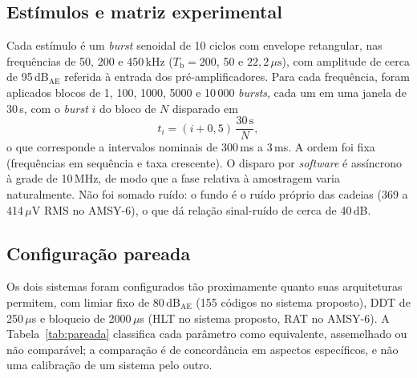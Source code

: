 \subsection{Estímulos e matriz experimental}
\label{subsec:sinais_teste}
\label{v2:subsec:sinais_teste}

Cada estímulo é um \textit{burst} senoidal de 10 ciclos com envelope retangular, nas frequências de 50, 200 e 450\,kHz (\(T_{\mathrm{b}} = 200\), 50 e \(22{,}2\,\mu\mathrm{s}\)), com amplitude de cerca de 95\,dB\(_{\mathrm{AE}}\) referida à entrada dos pré-amplificadores. Para cada frequência, foram aplicados blocos de 1, 100, 1000, 5000 e 10\,000 \textit{bursts}, cada um em uma janela de 30\,s, com o \textit{burst} \(i\) do bloco de \(N\) disparado em
\begin{equation}
	t_i = (i + 0{,}5)\,\frac{30\,\mathrm{s}}{N},
	\label{eq:instantes_disparo}
\end{equation}
o que corresponde a intervalos nominais de 300\,ms a 3\,ms. A ordem foi fixa (frequências em sequência e taxa crescente). O disparo por \textit{software} é assíncrono à grade de 10\,MHz, de modo que a fase relativa à amostragem varia naturalmente. Não foi somado ruído: o fundo é o ruído próprio das cadeias (369 a 414\,\(\mu\)V RMS no AMSY-6), o que dá relação sinal-ruído de cerca de 40\,dB.

\subsection{Configuração pareada}
\label{subsec:configuracao_pareada}

Os dois sistemas foram configurados tão proximamente quanto suas arquiteturas permitem, com limiar fixo de 80\,dB\(_{\mathrm{AE}}\) (155 códigos no sistema proposto), DDT de 250\,\(\mu\)s e bloqueio de 2000\,\(\mu\)s (HLT no sistema proposto, RAT no AMSY-6). A Tabela~\ref{tab:pareada} classifica cada parâmetro como equivalente, assemelhado ou não comparável; a comparação é de concordância em aspectos específicos, e não uma calibração de um sistema pelo outro.

